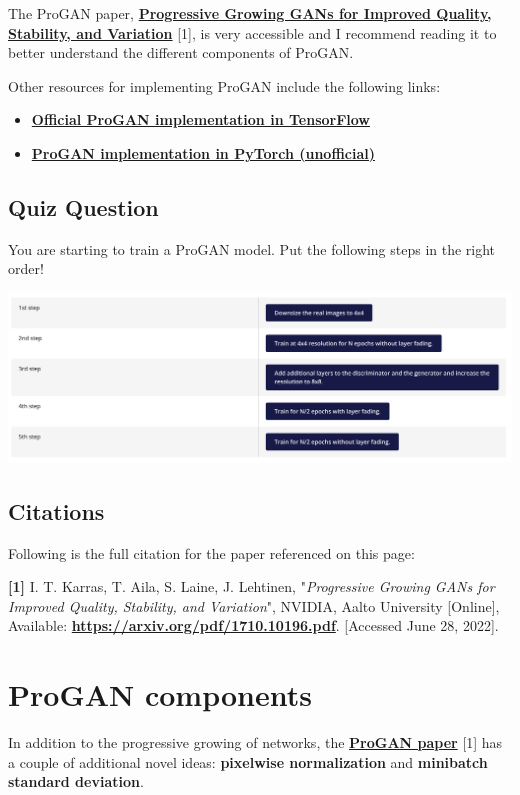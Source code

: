 The ProGAN paper, \href{https://arxiv.org/pdf/1710.10196.pdf}{\textbf{Progressive Growing GANs for Improved Quality, Stability, and Variation}} [1], is very accessible and I recommend reading it to better understand the different components of ProGAN.

Other resources for implementing ProGAN include the following links:

\begin{itemize}
    \item \href{https://github.com/tkarras/progressive_growing_of_gans}{\textbf{Official ProGAN implementation in TensorFlow}}
    \item \href{https://github.com/akanimax/pro_gan_pytorch}{\textbf{\textbf{ProGAN implementation in PyTorch (unofficial)}
}}
\end{itemize}
\subsection{Quiz Question}
You are starting to train a ProGAN model. Put the following steps in the right order!

\includegraphics[width=1\linewidth]{img//genAdvNet//modernGAN/quizPGAN.png}

\subsection{Citations}

Following is the full citation for the paper referenced on this page: \newline

\textbf{[1]} I. T. Karras, T. Aila, S. Laine, J. Lehtinen, "\textit{Progressive Growing GANs for Improved Quality, Stability, and Variation}", NVIDIA, Aalto University [Online], Available: \href{https://arxiv.org/pdf/1710.10196.pdf}{\textbf{https://arxiv.org/pdf/1710.10196.pdf}}. [Accessed June 28, 2022].

\section{ProGAN components}
In addition to the progressive growing of networks, the \href{https://arxiv.org/pdf/1710.10196.pdf}{\textbf{ProGAN paper}} [1] has a couple of additional novel ideas: \textbf{pixelwise normalization} and \textbf{minibatch standard deviation}.

